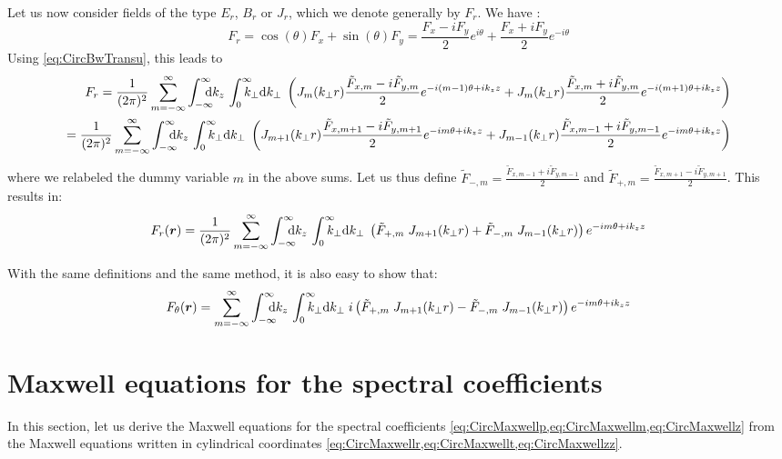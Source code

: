 Let us now consider fields of the type $E_r$, $B_r$ or $J_r$, which we
denote generally by $F_r$. We have :
\[ F_r = \cos(\theta) F_x + \sin(\theta) F_y 
= \frac{F_x - iF_y}{2}e^{i\theta} + \frac{F_x +
  iF_y}{2}e^{-i\theta} \] 
Using \cref{eq:CircBwTransu}, this leads to
\begin{align} 
F_r =   \frac{1}{(2\pi)^2}\sum_{m=-\infty}^{\infty} \Integ{k_z}\,\RInteg{k_\perp }\;
\left(  J_m(k_\perp r) \frac{\tilde{F}_{x,m} -
    i\tilde{F}_{y,m}}{2}e^{-i(m-1)\theta +ik_z z} + J_m(k_\perp r)
  \frac{\tilde{F}_{x,m} +   i\tilde{F}_{y,m}}{2}e^{-i(m+1)\theta +
    ik_z z} \right) \\
=  \frac{1}{(2\pi)^2}\sum_{m=-\infty}^{\infty} \Integ{k_z}\,\RInteg{k_\perp }\;
\left(  J_{m+1}(k_\perp r) \frac{\tilde{F}_{x,m+1} -
    i\tilde{F}_{y,m+1}}{2}e^{-im\theta +ik_z z} + J_{m-1}(k_\perp r)
  \frac{\tilde{F}_{x,m-1} +   i\tilde{F}_{y,m-1}}{2}e^{-im\theta +
    ik_z z} \right) 
\end{align}
where we relabeled the dummy variable $m$ in the above sums. Let us
thus define $\tilde{F}_{-,m} = \frac{\tilde{F}_{x,m-1} +
    i\tilde{F}_{y,m-1}}{2}$ and $\tilde{F}_{+,m} = \frac{\tilde{F}_{x,m+1} -
    i\tilde{F}_{y,m+1}}{2}$. This results in:
\begin{equation} 
F_r(\vec{r}) =  \frac{1}{(2\pi)^2}\sum_{m=-\infty}^{\infty} \Integ{k_z}\,\RInteg{k_\perp }\;
\left( \tilde{F}_{+,m}\; J_{m+1}(k_\perp r) +\tilde{F}_{-,m}\; J_{m-1}(k_\perp r)
\right)  e^{-im\theta +ik_z z}
\end{equation}

With the same definitions and the same method, it is also easy to show that:
\begin{equation} 
F_\theta(\vec{r}) = \sum_{m=-\infty}^{\infty} \Integ{k_z}\,\RInteg{k_\perp }\;
i\left( \tilde{F}_{+,m}\; J_{m+1}(k_\perp r) - \tilde{F}_{-,m}\; J_{m-1}(k_\perp r)
\right)  e^{-im\theta +ik_z z}
\end{equation}

\section{Maxwell equations for the spectral coefficients}
\label{sec:SpectMaxwell}

In this section, let us derive the Maxwell equations for the spectral
coefficients \cref{eq:CircMaxwellp,eq:CircMaxwellm,eq:CircMaxwellz}
from the Maxwell equations written in cylindrical coordinates \cref{eq:CircMaxwellr,eq:CircMaxwellt,eq:CircMaxwellzz}.

